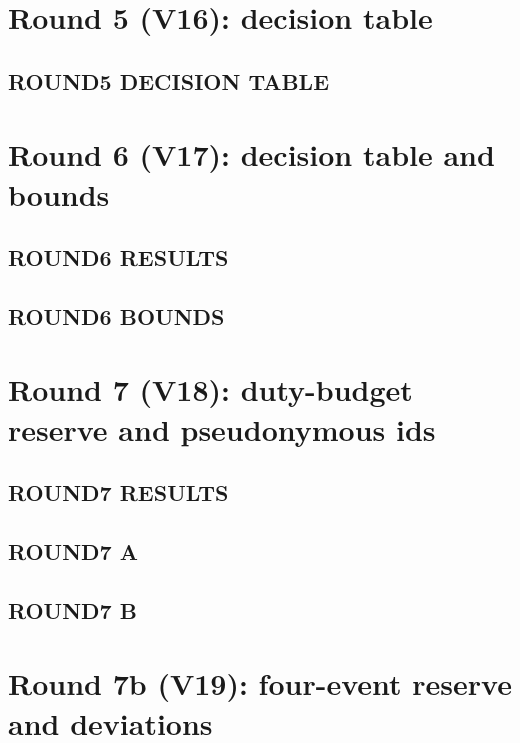 \documentclass[10pt,a4paper]{article}
\begin{document}
\section{Round 5 (V16): decision table}

\subsection{ROUND5 DECISION TABLE}


\section{Round 6 (V17): decision table and bounds}

\subsection{ROUND6 RESULTS}


\subsection{ROUND6 BOUNDS}


\section{Round 7 (V18): duty-budget reserve and pseudonymous ids}

\subsection{ROUND7 RESULTS}


\subsection{ROUND7 A}


\subsection{ROUND7 B}


\section{Round 7b (V19): four-event reserve and deviations}
\end{document}
